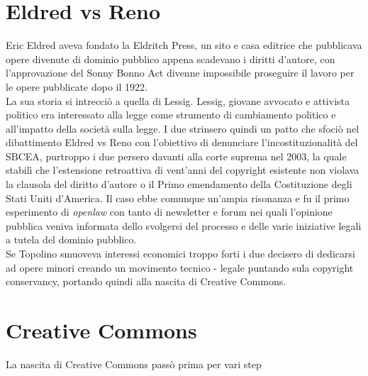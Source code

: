 \section{Eldred vs Reno}

Eric Eldred aveva fondato la Eldritch Press, un sito e casa editrice che pubblicava opere divenute di dominio pubblico appena scadevano i diritti d'autore, con l'approvazione del Sonny Bonno Act divenne impossibile proseguire il lavoro per le opere pubblicate dopo il 1922. \\

La sua storia si intrecciò a quella di Lessig. Lessig, giovane avvocato e attivista politico era interessato alla legge come strumento di cambiamento politico e all'impatto della società sulla legge. I due strinsero quindi un patto che sfociò nel dibattimento Eldred vs Reno con l'obiettivo di denunciare l'incostituzionalità del SBCEA, purtroppo i due persero davanti alla corte suprema nel 2003, la quale stabilì che l'estensione retroattiva di vent'anni del copyright esistente non violava la clausola del diritto d'autore o il Primo emendamento della Costituzione degli Stati Uniti d'America.  Il caso ebbe comunque un'ampia risonanza e fu il primo esperimento di \textit{openlaw} con tanto di newsletter e forum nei quali l'opinione pubblica veniva informata dello svolgersi del processo e delle varie iniziative legali a tutela del dominio pubblico.\\

Se Topolino smuoveva interessi economici troppo forti i due decisero di dedicarsi ad opere minori creando un movimento tecnico - legale puntando sula copyright conservancy, portando quindi alla nascita di Creative Commons.

\section{Creative Commons}
La nascita di Creative Commons passò prima per vari step

